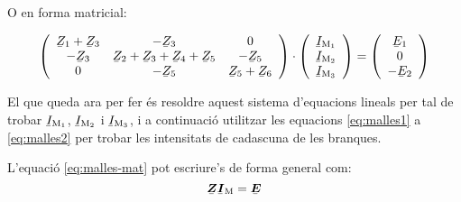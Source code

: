 O en forma matricial:

\begin{equation}\label{eq:malles-mat}
  \left(
    \begin{array}{ccc}
      \cmplx{Z}_1 + \cmplx{Z}_3 & -\cmplx{Z}_3 & 0 \\
      -\cmplx{Z}_3 & \cmplx{Z}_2 + \cmplx{Z}_3+ \cmplx{Z}_4+ \cmplx{Z}_5 & -\cmplx{Z}_5 \\
      0 & -\cmplx{Z}_5 & \cmplx{Z}_5 + \cmplx{Z}_6 \\
    \end{array}
  \right)
  \cdot
  \left(
      \begin{array}{c}
        \cmplx{I}\ped{M_1} \\
        \cmplx{I}\ped{M_2} \\
        \cmplx{I}\ped{M_3} \\
      \end{array}
  \right)
  =
  \left(
      \begin{array}{c}
        \cmplx{E}_1 \\
        0 \\
        -\cmplx{E}_2 \\
      \end{array}
  \right)
\end{equation}

El que queda ara per fer és resoldre aquest sistema d'equacions lineals per tal de trobar $\cmplx{I}\ped{M_1}$, $\cmplx{I}\ped{M_2}$ i $\cmplx{I}\ped{M_3}$, i a continuació utilitzar les equacions \eqref{eq:malles1} a \eqref{eq:malles2} per trobar les intensitats de cadascuna de les branques.


L'equació \eqref{eq:malles-mat} pot escriure's de forma general com:
\begin{equation}
  \mcmplx{Z} \mcmplx{I}\ped{M} = \mcmplx{E}
\end{equation}

